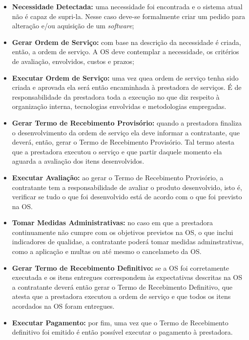 \begin{itemize}
  \item \textbf{Necessidade Detectada:} uma necessidade foi encontrada e o
  sistema atual não é capaz de supri-la. Nesse caso deve-se formalmente criar
  um pedido para alteração e/ou aquisição de um \textit{software};
  \item \textbf{Gerar Ordem de Serviço:} com base na descrição da necessidade é
  criada, então, a ordem de serviço. A OS deve contemplar a necessidade, os
  critérios de avaliação, envolvidos, custos e prazos;
  \item \textbf{Executar Ordem de Serviço:} uma vez quea ordem de serviço tenha
  sido criada e aprovada ela será então encaminhada à prestadora de serviços. É
  de responsabilidade da prestadora toda a execução no que diz respeito à
  organização interna, tecnologias envolvidas e metodologias empregadas.
  \item \textbf{Gerar Termo de Recebimento Provisório:} quando a prestadora
  finaliza o desenvolvimento da ordem de serviço ela deve informar a contratante,
  que deverá, então, gerar o Termo de Recebimento Provisório. Tal termo atesta
  que a prestadora executou o serviço e que partir daquele momento ela aguarda
  a avaliação dos itens desenvolvidos.
  \item \textbf{Executar Avaliação:} ao gerar o Termo de Recebimento Provisório,
  a contratante tem a responsabilidade de avaliar o produto desenvolvido, isto é,
  verificar se tudo o que foi desenvolvido está de acordo com o que foi previsto
  na OS.
  \item \textbf{Tomar Medidas Administrativas:} no caso em que a prestadora
  continuamente não cumpre com os objetivos previstos na OS, o que inclui
  indicadores de qualidae, a contratante poderá tomar medidas adminstrativas,
  como a aplicação e multas ou até mesmo o cancelameto da OS.
  \item \textbf{Gerar Termo de Recebimento Definitivo:} se a OS foi corretamente
  executada e os itens entregues correspondem às expectativas descritas na
  OS a contratante deverá então gerar o Termo de Recebimento Definitivo, que
  atesta que a prestadora executou a ordem de serviço e que todos os itens
  acordados na OS foram entregues.
  \item \textbf{Executar Pagamento:} por fim, uma vez que o Termo de Recebimento
  definitivo foi emitido é então possível executar o pagamento à prestadora.
\end{itemize}
